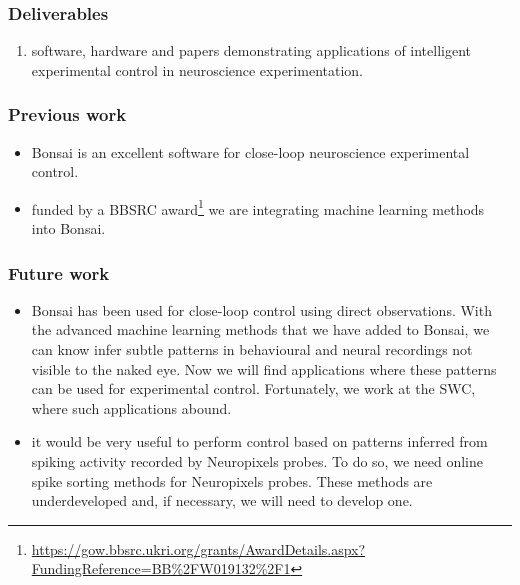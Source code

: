 
\begin{frame}
    \frametitle{Deliverables}

    \begin{enumerate}

        \item software, hardware and papers demonstrating applications of
            intelligent experimental control in neuroscience experimentation.

    \end{enumerate}

\end{frame}

\begin{frame}
    \frametitle{Previous work}

    \begin{itemize}

        \item Bonsai is an excellent software for close-loop
            neuroscience experimental control.

        \item funded by a BBSRC
            award\footnote{\url{https://gow.bbsrc.ukri.org/grants/AwardDetails.aspx?FundingReference=BB\%2FW019132\%2F1}}
            we are integrating machine learning methods into Bonsai.

    \end{itemize}

\end{frame}


\begin{frame}
    \frametitle{Future work}

    \begin{itemize}

        \item Bonsai has been used for close-loop control using direct
            observations. With the advanced machine learning methods that we have
            added to Bonsai, we can know infer subtle patterns in behavioural and
            neural recordings not visible to the naked eye. Now we will find
            applications where these patterns can be used for experimental control.
            Fortunately, we work at the SWC, where such applications abound.

        \item it would be very useful to perform control based on patterns inferred
            from spiking activity recorded by Neuropixels probes. To do so, we need
            online spike sorting methods for Neuropixels probes. These methods are
            underdeveloped and, if necessary, we will need to develop one.

    \end{itemize}

\end{frame}

